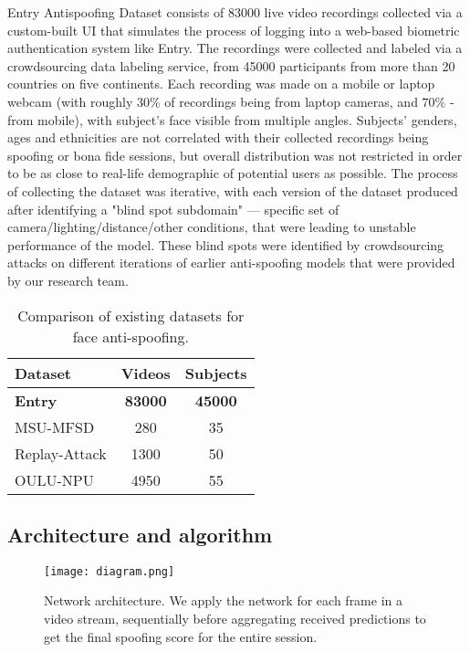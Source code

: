 \documentclass[10pt,twocolumn,letterpaper]{article}
\begin{document}
Entry Antispoofing Dataset consists of 83000 live video recordings collected via a custom-built UI that simulates the process of logging into a web-based biometric authentication system like Entry. The recordings were collected and labeled via a crowdsourcing data labeling service, from 45000 participants from more than 20 countries on five continents. 
Each recording was made on a mobile or laptop webcam (with roughly $30\%$ of recordings being from laptop cameras, and $70\%$ - from mobile), with subject's face visible from multiple angles. Subjects' genders, ages and ethnicities are not correlated with their collected recordings being spoofing or bona fide sessions, but overall distribution was not restricted in order to be as close to real-life demographic of potential users as possible. The process of collecting the dataset was iterative, with each version of the dataset produced after identifying a "blind spot subdomain" — specific set of camera/lighting/distance/other conditions, that were leading to unstable performance of the model. These blind spots were identified by crowdsourcing attacks on different iterations of earlier anti-spoofing models that were provided by our research team.  

\begin{table}[h]
  \centering
  \begin{tabular}{l | c | c}\toprule
    \textbf{Dataset} & \textbf{Videos} & \textbf{Subjects} \\
    \midrule
    \midrule
    \textbf{Entry} & \textbf{83000} & \textbf{45000} \\
    MSU-MFSD\cite{MFSD}      & 280  & 35 \\
    Replay-Attack\cite{mci/Chingovska2012} & 1300 & 50 \\
    OULU-NPU\cite{OULU_NPU_2017}      & 4950 & 55 \\
    \bottomrule
  \end{tabular}
  \caption{Comparison of existing datasets for face anti-spoofing.}
  \label{datasets}
\end{table}


\subsection{Architecture and algorithm}

\begin{figure}[h]
  \centering
\texttt{[image: diagram.png]}
   \caption{Network architecture. We apply the network for each frame in a video stream, sequentially before aggregating received predictions to get the final spoofing score for the entire session.}
   \label{fig:onecol}
\end{figure}
\end{document}
